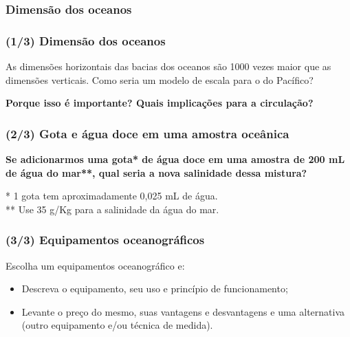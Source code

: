 \begin{frame}
    \frametitle{Dimensão dos oceanos}
    \centerline{}
\end{frame}


\begin{frame}
    \frametitle{(1/3) Dimensão dos oceanos}

    \small{As dimensões horizontais das bacias dos oceanos são 1000
    vezes maior que as dimensões verticais.
    Como seria um modelo de escala para o do Pacífico?
    }
    \pause

    \begin{block}{}
      \bf{Porque isso é importante?  Quais implicações para a circulação?}
    \end{block}
\end{frame}

\begin{frame}
    \frametitle{(2/3) Gota e água doce em uma amostra oceânica}
    \begin{block}{}
        \bf{Se adicionarmos uma gota* de água doce em uma amostra de
        200 mL de água do mar**, qual seria a nova salinidade dessa mistura?}
    \end{block}
    * 1 gota tem aproximadamente 0,025 mL de água.\\
    ** Use 35 g/Kg para a salinidade da água do mar.
\end{frame}


\begin{frame}
    \frametitle{(3/3) Equipamentos oceanográficos}
    \begin{block}{}
        Escolha um equipamentos oceanográfico e:
        \begin{itemize}
          \item Descreva o equipamento, seu uso e  princípio de funcionamento;
          \item Levante o preço do mesmo, suas vantagens e desvantagens e uma
                alternativa (outro equipamento e/ou técnica de medida).
        \end{itemize}
    \end{block}
\end{frame}


